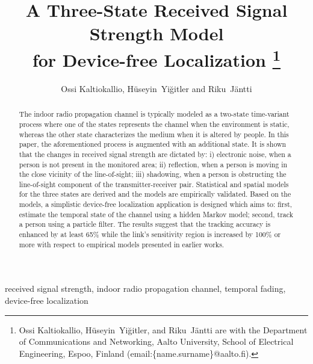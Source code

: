 \documentclass[journal, 10pt, twocolumn, balance]{IEEEtran}
\begin{document}
\setlength{\dashlinegap}{1.0pt}




\title{A Three-State Received Signal Strength Model \\ for Device-free Localization
\thanks{Ossi Kaltiokallio, H\"{u}seyin~Yi\u{g}itler, and Riku~J\"{a}ntti are with the Department of Communications and Networking, Aalto University, School of Electrical Engineering, Espoo, Finland (email:\{name.surname\}@aalto.fi).}}

\author{Ossi Kaltiokallio, H\"{u}seyin~Yi\u{g}itler and Riku~J\"{a}ntti}



\maketitle

\begin{abstract}
The indoor radio propagation channel is typically modeled as a two-state time-variant process where one of the states represents the channel when the environment is static, whereas the other state characterizes the medium when it is altered by people. In this paper, the aforementioned process is augmented with an additional state. It is shown that the changes in received signal strength are dictated by: i) electronic noise, when a person is not present in the monitored area; ii) reflection, when a person is moving in the close vicinity of the line-of-sight; iii) shadowing, when a person is obstructing the line-of-sight component of the transmitter-receiver pair. Statistical and spatial models for the three states are derived and the models are empirically validated. Based on the models, a simplistic device-free localization application is designed which aims to: first, estimate the temporal state of the channel using a hidden Markov model; second, track a person using a particle filter. The results suggest that the tracking accuracy is enhanced by at least 65\% while the link's sensitivity region is increased by 100\% or more with respect to empirical models presented in earlier works.
\end{abstract}

\begin{IEEEkeywords}
received signal strength, indoor radio propagation channel, temporal fading, device-free localization
\end{IEEEkeywords}
\end{document}
